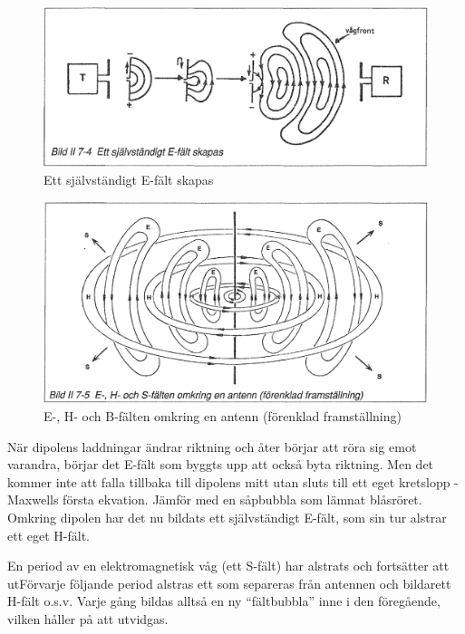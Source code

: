 \begin{figure}[h]
\begin{center}
\includegraphics[width=14cm]{images/bild_2_7-04}
\caption{Ett självständigt E-fält skapas}
\label{fig:BildII7-04}
\end{center}
\end{figure}

\begin{figure}[h]
\begin{center}
\includegraphics[width=14cm]{images/bild_2_7-05}
\caption{E-, H- och B-fälten omkring en antenn (förenklad framställning)}
\label{fig:BildII7-05}
\end{center}
\end{figure}

När dipolens laddningar ändrar riktning och åter börjar att röra sig
emot varandra, börjar det E-fält som byggts upp att också byta
riktning. Men det kommer inte att falla tillbaka till dipolens mitt
utan sluts till ett eget kretslopp - Maxwells första ekvation. Jämför
med en såpbubbla som lämnat blåsröret.  Omkring dipolen har det nu
bildats ett självständigt E-fält, som sin tur alstrar ett eget H-fält.

En period av en elektromagnetisk våg (ett S-fält) har alstrats och
fortsätter att utFörvarje följande period alstras ett som separeras
från antennen och bildarett H-fält o.s.v. Varje gång bildas alltså en
ny ``fältbubbla'' inne i den föregående, vilken håller på att
utvidgas.

